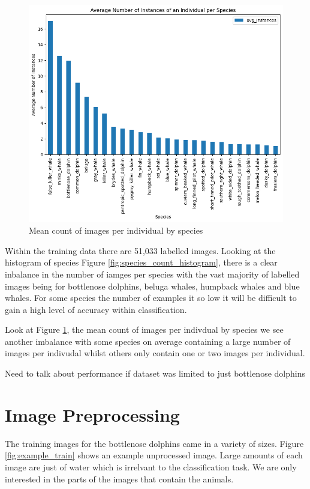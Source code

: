 \documentclass{article}
\begin{document}
\begin{figure}
    \includegraphics[width=\linewidth]{mean_individuals_histogram.png}
    \caption{Mean count of images per individual by species}
    \label{fig:individual_mean_count_histogram}
\end{figure}

Within the training data there are 51,033 labelled images. Looking at the histogram of species Figure \ref{fig:species_count_histogram}, there is a clear inbalance in the number of iamges per species with the vast majority
of labelled images being for bottlenose dolphins, beluga whales, humpback whales and blue whales. For some species the number of examples it so low it will be difficult to gain a high level of accuracy within classification.

Look at Figure \ref{fig:individual_mean_count_histogram}, the mean count of images per indivdual by species we see another imbalance with some species on average containing a large number of images per indivudal whilst others only contain one or two images per individual.

Need to talk about performance if dataset was limited to just bottlenose dolphins

\section{Image Preprocessing}

The training images for the bottlenose dolphins came in a variety of sizes. Figure \ref{fig:example_train} shows an example unprocessed image. Large amounts of each image are just of water which is irrelvant to the classification task. We are only interested in the parts of the 
images that contain the animals.
\end{document}
